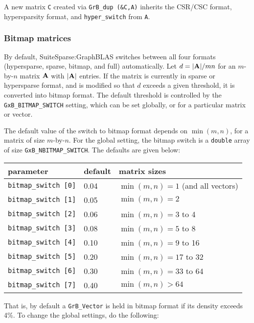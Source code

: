 A new matrix \verb'C' created via \verb'GrB_dup (&C,A)' inherits the CSR/CSC
format, hypersparsity format, and \verb'hyper_switch' from \verb'A'.

\subsubsection{Bitmap matrices}
\label{bitmap_switch}

By default, SuiteSparse:GraphBLAS switches between all four formats
(hypersparse, sparse, bitmap, and full) automatically.  Let $d = |{\bf A}|/mn$
for an $m$-by-$n$ matrix $\bf A$ with $|{\bf A}|$ entries.  If the matrix is
currently in sparse or hypersparse format, and is modified so that $d$ exceeds
a given threshold, it is converted into bitmap format.  The default threshold
is controlled by the \verb'GxB_BITMAP_SWITCH' setting, which can be set
globally, or for a particular matrix or vector.

The default value of the switch to bitmap format depends on $\min(m,n)$, for a
matrix of size $m$-by-$n$.  For the global setting, the bitmap switch is a
\verb'double' array of size \verb'GxB_NBITMAP_SWITCH'.  The defaults are given
below:

\vspace{0.2in}
{\small
\begin{tabular}{lll}
parameter & default & matrix sizes \\
\hline
\verb'bitmap_switch [0]' & 0.04 & $\min(m,n) = 1$ (and all vectors) \\
\verb'bitmap_switch [1]' & 0.05 & $\min(m,n) = 2$ \\
\verb'bitmap_switch [2]' & 0.06 & $\min(m,n) = 3$ to 4 \\
\verb'bitmap_switch [3]' & 0.08 & $\min(m,n) = 5$ to 8 \\
\verb'bitmap_switch [4]' & 0.10 & $\min(m,n) = 9$ to 16\\
\verb'bitmap_switch [5]' & 0.20 & $\min(m,n) = 17$ to 32\\
\verb'bitmap_switch [6]' & 0.30 & $\min(m,n) = 33$ to 64 \\
\verb'bitmap_switch [7]' & 0.40 & $\min(m,n) > 64$ \\
\end{tabular}
}
\vspace{0.2in}

That is, by default a \verb'GrB_Vector' is held in bitmap format if its density
exceeds 4\%.  To change the global settings, do the following:

